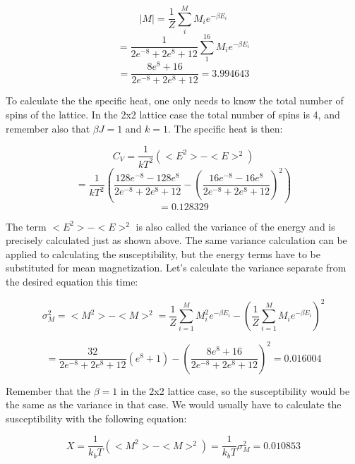 \documentclass[10pt,a4paper]{article}
\begin{document}
$$
|M| = \frac{1}{Z}\sum^{M}_{i}M_ie^{-\beta E_i}
$$
$$
 = \frac{1}{2e^{-8} + 2e^8 + 12}\sum^{16}_{1}M_ie^{-\beta E_i}
$$
$$
 = \frac{8e^{8} + 16}{2e^{-8} + 2e^8 + 12} = 3.994643
$$



\noindent To calculate the the specific heat, one only needs to know the total number of spins of the lattice. In the 2x2 lattice case the total number of spins is 4, and remember also that $\beta J = 1$ and $k = 1$. The specific heat is then:

$$
C_V = \frac{1}{kT^2}(<E^2> - <E>^2)
$$
$$
 = \frac{1}{kT^2}(\frac{128e^{-8} - 128e^8}{2e^{-8} + 2e^8 + 12} - (\frac{16e^{-8} - 16e^8}{2e^{-8} + 2e^8 + 12})^2)
$$
$$
 = 0.128329
$$

\noindent The term $<E^2> - <E>^2$ is also called the variance of the energy and is precisely calculated just as shown above. The same variance calculation can be applied to calculating the susceptibility, but the energy terms have to be substituted for mean magnetization.
Let's calculate the variance separate from the desired equation this time:

$$
\sigma_M^2 = <M^2>-<M>^2 = \frac{1}{Z}\sum^{M}_{i = 1}M_i^2 e^{-\beta E_i} - (\frac{1}{Z}\sum^{M}_{i = 1}M_i e^{-\beta E_i})^2
$$

$$
 = \frac{32}{2e^{-8} + 2e^8 + 12}(e^{8}+1) - (\frac{8e^8 + 16}{2e^{-8} + 2e^8 + 12})^2 = 0.016004
$$

\noindent Remember that the $\beta = 1$ in the 2x2 lattice case, so the susceptibility would be the same as the variance in that case. We would usually have to calculate the susceptibility with the following equation:

$$
X = \frac{1}{k_bT}(<M^2> - <M>^2) = \frac{1}{k_bT}\sigma_M^2 = 0.010853
$$
\end{document}
